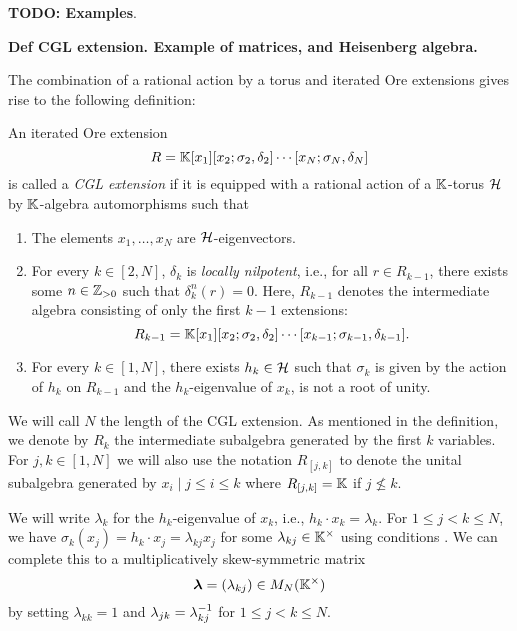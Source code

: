 \documentclass{article}
\begin{document}
\textbf{TODO: Examples}.

\textbf{Def CGL extension. Example of matrices, and Heisenberg algebra.}

The combination of a rational action by a torus and iterated Ore extensions gives rise
to the following definition:
\begin{definition}
	An iterated Ore extension
	\begin{equation*}
		R = \mathbb{K}[x_1][x_2; \sigma_2, \delta_2]\cdots [x_N; \sigma_N, \delta_N]
	\end{equation*}
	is called a \emph{CGL extension} if it is equipped with a rational action of a $\mathbb{K}$-torus $\mathcal{H}$ by $\mathbb{K}$-algebra automorphisms such that
	\begin{enumerate}
		\item\label{itm:x_i-eigenvectors} The elements $x_1, \dots, x_N$ are $\mathcal{H}$-eigenvectors.
		\item For every $k\in [2, N]$, $\delta_k$ is \emph{locally
			      nilpotent}, i.e., for all $r \in R_{k-1}$, there exists some
		      $n \in \mathbb{Z}_{>0}$ such that $\delta_k^n (r) = 0$. Here, $R_{k-1}$ denotes the
		      intermediate algebra consisting of only the first $k-1$ extensions:
		      \begin{equation*}
			      R_{k-1} = \mathbb{K}[x_1][x_2; \sigma_2, \delta_2]\cdots[x_{k-1};\sigma_{k-1}, \delta_{k-1}].
		      \end{equation*}
		      \item\label{itm:sigma_k-is-h_k} For every $k \in [1, N]$, there exists $h_k \in \mathcal{H}$ such that $\sigma_k$ is given by the action of $h_k$ on $R_{k-1}$ and the $h_k$-eigenvalue of $x_k$, is not a root of unity.
	\end{enumerate}
\end{definition}

We will call $N$ the length of the CGL extension. As
mentioned in the definition, we denote by $R_k$ the intermediate subalgebra generated
by the first $k$ variables. For $j, k \in [1, N]$ we will also use the notation $R_{[j,
					k]}$ to denote the unital subalgebra generated by ${x_i \mid j \leq i \leq k}$ where
$R_{[j, k]} = \mathbb{K}$ if $j \nleq k$.

We will write $\lambda_k$ for the $h_k$-eigenvalue of $x_k$, i.e., $h_k \cdot x_k =
	\lambda_k$. For $1 \leq j < k \leq N$, we have $\sigma_k (x_j) = h_k \cdot x_j =
	\lambda_{kj} x_j$ for some $\lambda_{kj} \in \mathbb{K}^\times$ using conditions
. We can complete this to a
multiplicatively skew-symmetric matrix
\begin{equation}\label{eq:CGL_lambda}
	\boldsymbol{\lambda}= (\lambda_{kj}) \in M_N(\mathbb{K}^\times)
\end{equation}
%
by setting $\lambda_{kk} = 1$ and $\lambda_{jk} = \lambda_{kj}^{-1}$ for $1 \leq j < k
	\leq N$.
\end{document}
